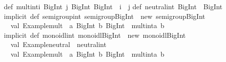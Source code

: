 \begin{isabellebody}
\begin{isamarkuptext}
\isanewline
def\ mult{}int{}i{}\ BigInt{}\ j{}\ BigInt{}{}\ BigInt\ {}\ i\ {}\ j\isanewline
\isanewline
def\ neutral{}int{}\ BigInt\ {}\ BigInt{}{}{}\isanewline
\isanewline
implicit\ def\ semigroup{}int{}\ semigroup{}BigInt{}\ {}\ new\ semigroup{}BigInt{}\ {}\isanewline
\ \ val\ {}Example{}mult{}\ {}\ {}a{}\ BigInt{}\ b{}\ BigInt{}\ {}{}\ mult{}int{}a{}\ b{}\isanewline
{}\isanewline
\isanewline
implicit\ def\ monoidl{}int{}\ monoidl{}BigInt{}\ {}\ new\ monoidl{}BigInt{}\ {}\isanewline
\ \ val\ {}Example{}neutral{}\ {}\ neutral{}int\isanewline
\ \ val\ {}Example{}mult{}\ {}\ {}a{}\ BigInt{}\ b{}\ BigInt{}\ {}{}\ mult{}int{}a{}\ b{}\isanewline

\end{isamarkuptext}
\end{isabellebody}

